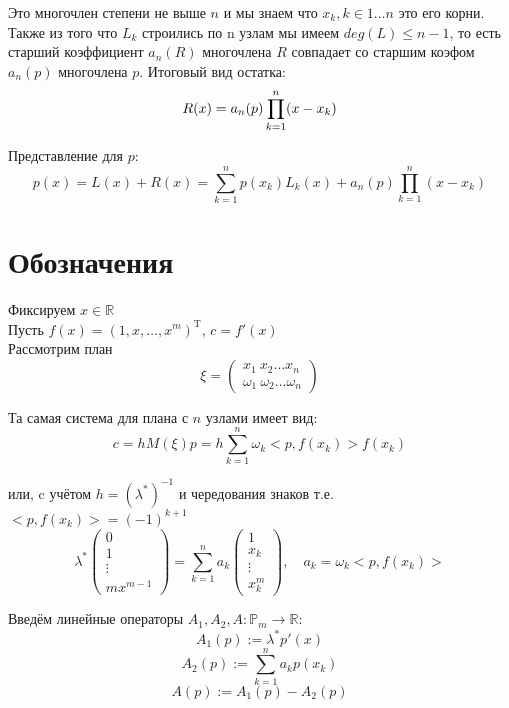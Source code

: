 \documentclass[12pt,a4paper]{article}
\begin{document}
	\noindent Это многочлен степени не выше $n$ и мы знаем что $x_k, k \in 1 \ldots n$ это его корни. Также из того что $L_k$ строились по n узлам мы имеем $deg(L) \leq n-1$, 
	то есть старший коэффициент $a_n(R)$ многочлена $R$ совпадает со старшим коэфом $a_n(p)$ многочлена $p$.
	Итоговый вид остатка:
	\[
	R(x) = a_n(p) \prod_{k=1}^{n} (x-x_k) \\
	\]
	
	\noindent Представление для $p$:
	\begin{equation}
	p(x) = 
	L(x) + R(x) = 
    \sum_{k=1}^{n} p(x_k) L_k(x) + 
    a_n(p) \prod_{k=1}^{n} (x-x_k)
    \label{eq:lagr_expansion}
	\end{equation}
	
	\newpage
	
	\section{Обозначения}
	Фиксируем $x \in \mathbb{R}$\\
	Пусть $f(x) = (1, x, \ldots, x^m)^\mathrm{T}$, $c=f'(x)$\\
	
	\noindent Рассмотрим план
	\[
		\xi = 
		\left(
		\begin{matrix}
		x_1 \ x_2 \ldots x_n \\
		\omega_1 \ \omega_2 \ldots \omega_n	
		\end{matrix}
		\right)
	\]
	
	\noindent Та самая система для плана с $n$ узлами имеет вид:
	\[
	c = h M(\xi) p = h \sum_{k=1}^{n} \omega_k <p,f(x_k)> f(x_k)
	\]	
	
	\noindent или, c учётом $h = (\lambda ^*)^{-1}$ и чередования знаков т.е. $<p,f(x_k)> = (-1)^{k+1}$
	\[
	\lambda ^*
	\begin{pmatrix}
	0 \\
	1 \\
	\vdots \\
	m x^{m-1}
	\end{pmatrix} = 
	\sum_{k=1}^{n} a_k 
	\begin{pmatrix}
		1 \\
		x_k \\
		\vdots \\
		x_k^{m}
	\end{pmatrix}, \quad a_k = \omega_k <p,f(x_k)>
	\]
	
	\noindent Введём линейные операторы $A_1, A_2, A: \mathbb{P}_m \to \mathbb{R}$:
	\[
	A_1(p) := \lambda^* p'(x)
	\]
	\[
	A_2(p) := \sum_{k=1}^{n} a_k p(x_k)
	\]
	\[
	A(p) := A_1(p) - A_2(p)
	\]
	
\end{document}
